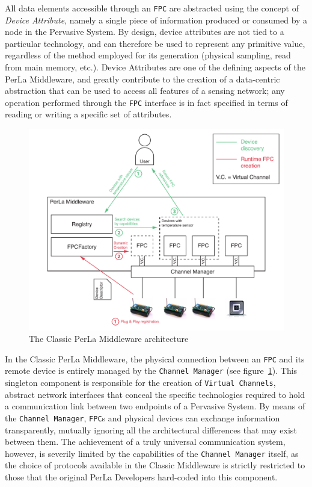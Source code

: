 All data elements accessible through an \texttt{FPC} are abstracted using the
concept of \textit{Device Attribute}, namely a single piece of information
produced or consumed by a node in the Pervasive System. By design, device
attributes are not tied to a particular technology, and can therefore be used
to represent any primitive value, regardless of the method employed for its
generation (physical sampling, read from main memory, etc.). Device Attributes
are one of the defining aspects of the PerLa Middleware, and greatly contribute
to the creation of a data-centric abstraction that can be used to access all
features of a sensing network; any operation performed through the \texttt{FPC}
interface is in fact specified in terms of reading or writing a specific set of
attributes.

\begin{figure}[h!]
\includegraphics[width=\textwidth]{imgs/classic_middleware_overview.pdf}
\caption{The Classic PerLa Middleware architecture}
\label{fig:classic_architecture}
\end{figure}

In the Classic PerLa Middleware, the physical connection between an
\texttt{FPC} and its remote device is entirely managed by the \texttt{Channel
Manager} (see figure~\ref{fig:classic_architecture}). This singleton component
is responsible for the creation of \texttt{Virtual Channels}, abstract network
interfaces that conceal the specific technologies required to hold a
communication link between two endpoints of a Pervasive System. By means of the
\texttt{Channel Manager}, \texttt{FPC}s and physical devices can exchange
information transparently, mutually ignoring all the architectural differences
that may exist between them. The achievement of a truly universal communication
system, however, is severily limited by the capabilities of the \texttt{Channel
Manager} itself, as the choice of protocols available in the Classic Middleware
is strictly restricted to those that the original PerLa Developers hard-coded
into this component.

